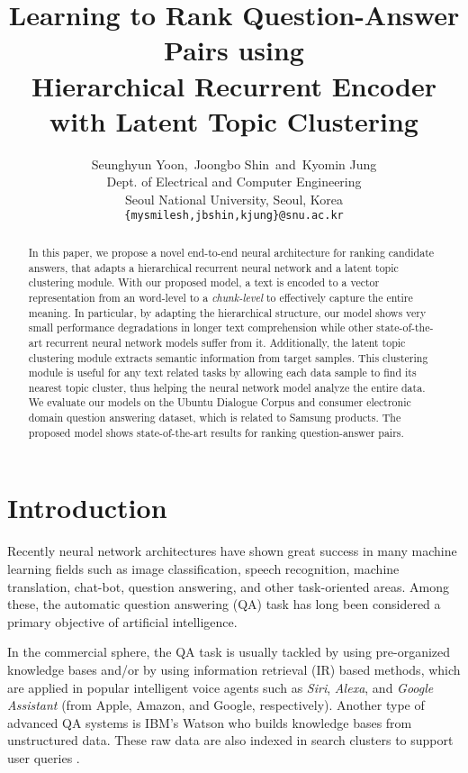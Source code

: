 \documentclass[11pt,a4paper]{article}
\title{Learning to Rank Question-Answer Pairs using \\ Hierarchical Recurrent Encoder with Latent Topic Clustering}
\author{Seunghyun Yoon,~Joongbo Shin~and~Kyomin Jung \\
  Dept. of Electrical and Computer Engineering \\
  Seoul National University, Seoul, Korea \\
  {\tt \{mysmilesh,jbshin,kjung\}@snu.ac.kr} }
\date{}
\begin{document}
\maketitle

\begin{abstract}
In this paper, we propose a novel end-to-end neural architecture for ranking candidate answers, that adapts a hierarchical recurrent neural network and a latent topic clustering module. 
With our proposed model, a text is encoded to a vector representation from an word-level to a \textit{chunk-level} to effectively capture the entire meaning. 
In particular, by adapting the hierarchical structure, our model shows very small performance degradations in longer text comprehension while other state-of-the-art recurrent neural network models suffer from it.
Additionally, the latent topic clustering module extracts semantic information from target samples.
This clustering module is useful for any text related tasks by allowing each data sample to find its nearest topic cluster, thus helping the neural network model analyze the entire data. 
We evaluate our models on the Ubuntu Dialogue Corpus and consumer electronic domain question answering dataset, which is related to Samsung products. 
The proposed model shows state-of-the-art results for ranking question-answer pairs.
\end{abstract}


\section{Introduction}
\label{intro}
Recently neural network architectures have shown great success in many machine learning fields such as image classification, speech recognition, machine translation, chat-bot, question answering, and other task-oriented areas. Among these, the automatic question answering (QA) task has long been considered a primary objective of artificial intelligence.

In the commercial sphere, the QA task is usually tackled by using pre-organized knowledge bases and/or by using information retrieval (IR) based methods, which are applied in popular intelligent voice agents such as \textit{Siri}, \textit{Alexa}, and \textit{Google Assistant} (from Apple, Amazon, and Google, respectively).
Another type of advanced QA systems is IBM's Watson who builds knowledge bases from unstructured data. These raw data are also indexed in search clusters to support user queries \cite{fan2012automatic,chu2012finding}. 
\end{document}
